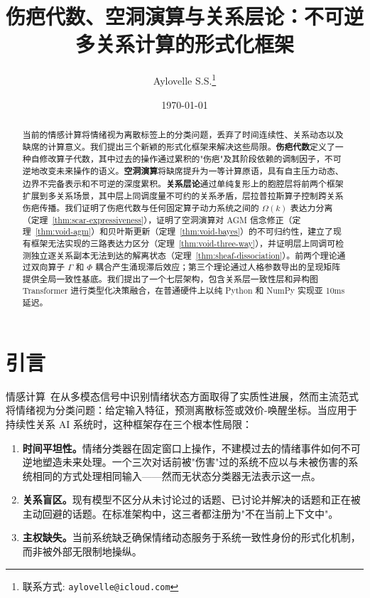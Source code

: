 \documentclass[11pt]{article}
\title{伤疤代数、空洞演算与关系层论：不可逆多关系计算的形式化框架}
\author{
  Aylovelle S.S.\thanks{联系方式: \texttt{aylovelle@icloud.com}}
}
\date{\today}
\begin{document}
\maketitle

\begin{abstract}
当前的情感计算将情绪视为离散标签上的分类问题，丢弃了时间连续性、关系动态以及缺席的计算意义。我们提出三个新颖的形式化框架来解决这些局限。\textbf{伤疤代数}定义了一种自修改算子代数，其中过去的操作通过累积的"伤疤"及其阶段依赖的调制因子，不可逆地改变未来操作的语义。\textbf{空洞演算}将缺席提升为一等计算原语，具有自主压力动态、边界不完备表示和不可逆的深度累积。\textbf{关系层论}通过单纯复形上的胞腔层将前两个框架扩展到多关系场景，其中层上同调度量不可约的关系矛盾，层拉普拉斯算子控制跨关系伤疤传播。我们证明了伤疤代数与任何固定算子动力系统之间的 $\Omega(k)$ 表达力分离（定理~\ref{thm:scar-expressiveness}），证明了空洞演算对 AGM 信念修正（定理~\ref{thm:void-agm}）和贝叶斯更新（定理~\ref{thm:void-bayes}）的不可归约性，建立了现有框架无法实现的三路表达力区分（定理~\ref{thm:void-three-way}），并证明层上同调可检测独立逐关系副本无法到达的解离状态（定理~\ref{thm:sheaf-dissociation}）。前两个理论通过双向算子 $\Gamma$ 和 $\Phi$ 耦合产生涌现滞后效应；第三个理论通过人格参数导出的呈现矩阵提供全局一致性基底。我们提出了一个七层架构，包含关系层一致性层和异构图 Transformer 进行类型化决策融合，在普通硬件上以纯 Python 和 NumPy 实现亚 10ms 延迟。
\end{abstract}

\section{引言}
\label{sec:intro}

情感计算~\cite{picard1997}在从多模态信号中识别情绪状态方面取得了实质性进展，然而主流范式将情绪视为分类问题：给定输入特征，预测离散标签或效价-唤醒坐标。当应用于持续性关系 AI 系统时，这种框架存在三个根本性局限：

\begin{enumerate}[leftmargin=*]
\item \textbf{时间平坦性。}情绪分类器在固定窗口上操作，不建模过去的情绪事件如何不可逆地塑造未来处理。一个三次对话前被"伤害"过的系统不应以与未被伤害的系统相同的方式处理相同输入——然而无状态分类器无法表示这一点。

\item \textbf{关系盲区。}现有模型不区分从未讨论过的话题、已讨论并解决的话题和正在被主动回避的话题。在标准架构中，这三者都注册为"不在当前上下文中"。

\item \textbf{主权缺失。}当前系统缺乏确保情绪动态服务于系统一致性身份的形式化机制，而非被外部无限制地操纵。
\end{enumerate}
\end{document}

